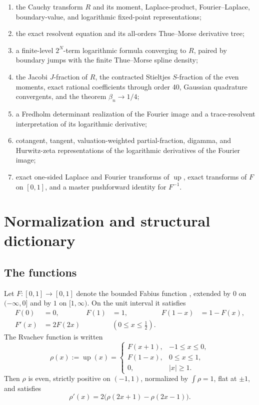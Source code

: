 \documentclass[11pt,oneside]{article}
\theoremstyle{definition}
\newcommand{\Up}{\operatorname{up}}
\begin{document}
\begin{enumerate}
\item the Cauchy transform \(R\) and its moment, Laplace-product, Fourier--Laplace,
      boundary-value, and logarithmic fixed-point representations;
\item the exact resolvent equation and its all-orders Thue--Morse derivative tree;
\item a finite-level \(2^N\)-term logarithmic formula converging to \(R\), paired by
      boundary jumps with the finite Thue--Morse spline density;
\item the Jacobi \(J\)-fraction of \(R\), the contracted Stieltjes \(S\)-fraction of the
      even moments, exact rational coefficients through order 40, Gaussian quadrature
      convergents, and the theorem \(\beta_n\to1/4\);
\item a Fredholm determinant realization of the Fourier image and a trace-resolvent
      interpretation of its logarithmic derivative;
\item cotangent, tangent, valuation-weighted partial-fraction, digamma, and Hurwitz-zeta
      representations of the logarithmic derivatives of the Fourier image;
\item exact one-sided Laplace and Fourier transforms of \(\Up\), exact transforms of
      \(F\) on \([0,1]\), and a master pushforward identity for \(F^{-1}\).
\end{enumerate}

\section{Normalization and structural dictionary}

\subsection{The functions}

Let \(F:[0,1]\to[0,1]\) denote the bounded Fabius function \cite{p3:Fabius1966,p3:AriasTranslation}, extended by \(0\) on
\(( -\infty,0]\) and by \(1\) on \([1,\infty)\).  On the unit interval it satisfies
\begin{align}
 F(0)&=0, & F(1)&=1, & F(1-x)&=1-F(x), \label{p3:eq:F-symmetry}\\
 F'(x)&=2F(2x) &&(0\le x\le\tfrac12). \label{p3:eq:F-diff}
\end{align}
The Rvachev function is written
\begin{equation}
 \rho(x):=\Up(x)=
 \begin{cases}
 F(x+1),&-1\le x\le0,\\
 F(1-x),&0\le x\le1,\\
 0,&|x|\ge1.
 \end{cases}                                                \label{p3:eq:rho-fold}
\end{equation}
Then \(\rho\) is even, strictly positive on \((-1,1)\), normalized by
\(\int\rho=1\), flat at \(\pm1\), and satisfies
\begin{equation}
 \rho'(x)=2\bigl(\rho(2x+1)-\rho(2x-1)\bigr).                \label{p3:eq:rho-dde}
\end{equation}
\end{document}
